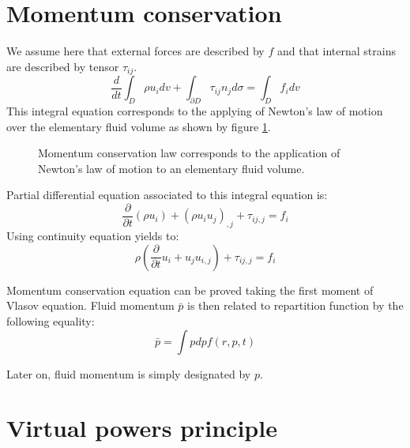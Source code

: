 \documentclass[12pt]{book}
\begin{document}
\section{Momentum conservation}
We assume here that external forces are described by $f$ and that internal
strains are described by tensor $\tau_{ij}$.
\begin{equation}
\frac{d}{dt}\int_D \rho u_idv+\int_{\partial D} \tau_{ij}
n_jd\sigma=\int_D f_idv 
\end{equation}
This integral equation corresponds to the applying of Newton's law of
motion over the elementary fluid volume as shown by
figure 
\ref{figconsp}. 
\begin{figure}[htb]
 \centerline{}   
 \caption{Momentum conservation law corresponds to the application of
   Newton's law of motion to an elementary fluid volume.}
 \label{figconsp}
\end{figure}
Partial differential equation associated to this integral equation is:
\begin{equation}
\frac{\partial}{\partial t}(\rho u_i)+(\rho u_i u_j)_{,j}+\tau_{ij,j}=f_i
\end{equation}
Using continuity equation yields to:
\begin{equation}
\rho(\frac{\partial}{\partial t}u_i+u_j u_{i,j})+\tau_{ij,j}=f_i
\end{equation}

\begin{rem}
Momentum conservation equation can be proved taking the first moment of
Vlasov equation. Fluid momentum $\bar p$ is then related to repartition
function by the following equality:
\begin{equation}
\bar p=\int p dp f(r,p,t)
\end{equation}
\end{rem}
Later on, fluid momentum is simply designated by $p$.
\section{Virtual powers principle}\label{secpuisvirtu}
\end{document}
